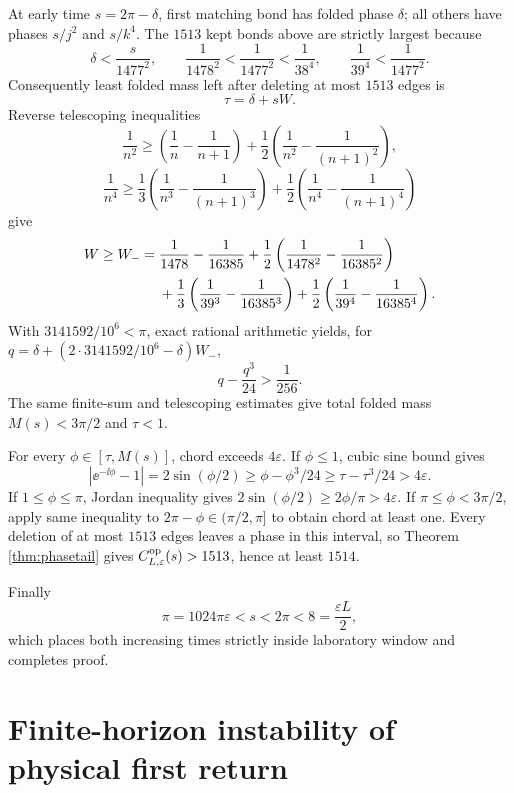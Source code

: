 At early time $s=2\pi-\delta$, first matching bond has folded phase $\delta$;
all others have phases $s/j^2$ and $s/k^4$.  The $1513$ kept bonds above are
strictly largest because
\[
 \delta<\frac{s}{1477^2},\qquad
 \frac1{1478^2}<\frac1{1477^2}<\frac1{38^4},\qquad
 \frac1{39^4}<\frac1{1477^2}.
\]
Consequently least folded mass left after deleting at most $1513$ edges is
\begin{equation}
 \tau=\delta+sW.                                      \label{eq:countertau}
\end{equation}
Reverse telescoping inequalities
\[
 \frac1{n^2}\ge\left(\frac1n-\frac1{n+1}\right)
 +\frac12\left(\frac1{n^2}-\frac1{(n+1)^2}\right),
\]
\[
 \frac1{n^4}\ge\frac13\left(\frac1{n^3}-\frac1{(n+1)^3}\right)
 +\frac12\left(\frac1{n^4}-\frac1{(n+1)^4}\right)
\]
give
\begin{align}
 W\ge W_-={}&\frac1{1478}-\frac1{16385}
 +\frac12\left(\frac1{1478^2}-\frac1{16385^2}\right)\notag\\
 &+\frac13\left(\frac1{39^3}-\frac1{16385^3}\right)
 +\frac12\left(\frac1{39^4}-\frac1{16385^4}\right). \label{eq:counterWminus}
\end{align}
With $3141592/10^6<\pi$, exact rational arithmetic yields, for
$q=\delta+(2\cdot3141592/10^6-\delta)W_-$,
\begin{equation}
 q-\frac{q^3}{24}>\frac1{256}.                       \label{eq:countercubic}
\end{equation}
The same finite-sum and telescoping estimates give total folded mass
$M(s)<3\pi/2$ and $\tau<1$.

For every $\phi\in[\tau,M(s)]$, chord exceeds $4\varepsilon$.  If
$\phi\le1$, cubic sine bound gives
\[
 |\ee^{-\ii\phi}-1|=2\sin(\phi/2)
 \ge\phi-\phi^3/24\ge\tau-\tau^3/24>4\varepsilon.
\]
If $1\le\phi\le\pi$, Jordan inequality gives
$2\sin(\phi/2)\ge2\phi/\pi>4\varepsilon$.  If
$\pi\le\phi<3\pi/2$, apply same inequality to $2\pi-\phi\in(\pi/2,\pi]$ to
obtain chord at least one.  Every deletion of at most $1513$ edges leaves a
phase in this interval, so Theorem \ref{thm:phasetail} gives
$C^{\rm op}_{L,\varepsilon}(s)>1513$, hence at least $1514$.

Finally
\[
 \pi=1024\pi\varepsilon<s<2\pi<8
 =\frac{\varepsilon L}{2},
\]
which places both increasing times strictly inside laboratory window and
completes proof.

\section{Finite-horizon instability of physical first return}
\label{app:horizon-instability}

